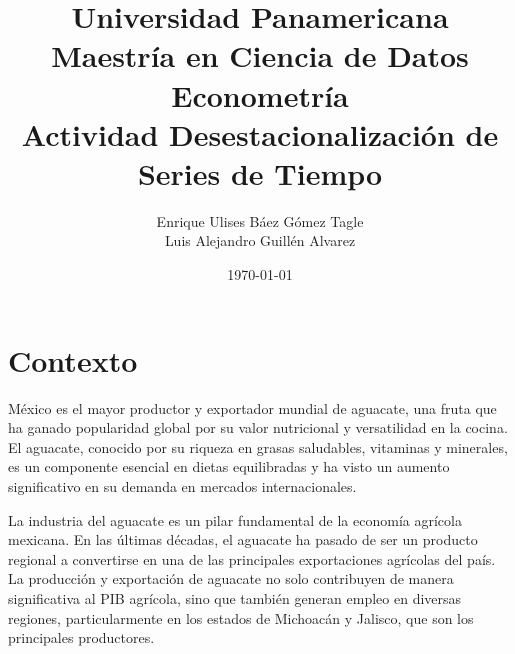 \documentclass[10pt]{article}
\title{Universidad Panamericana \\ Maestría en Ciencia de Datos 
\\ Econometría \\ \vspace{0.5cm} Actividad Desestacionalización de Series de Tiempo}
\author{Enrique Ulises Báez Gómez Tagle\\Luis Alejandro Guillén Alvarez}
\date{\today}
\begin{document}
\maketitle

\tableofcontents

\newpage
\section{Contexto}
  México es el mayor productor y exportador mundial de aguacate, una fruta que ha ganado popularidad global 
  por su valor nutricional y versatilidad en la cocina. El aguacate, conocido por su riqueza en grasas 
  saludables, vitaminas y minerales, es un componente esencial en dietas equilibradas y ha visto un aumento 
  significativo en su demanda en mercados internacionales.

  La industria del aguacate es un pilar fundamental de la economía agrícola mexicana. En las últimas 
  décadas, el aguacate ha pasado de ser un producto regional a convertirse en una de las principales 
  exportaciones agrícolas del país. La producción y exportación de aguacate no solo contribuyen de manera 
  significativa al PIB agrícola, sino que también generan empleo en diversas regiones, particularmente en 
  los estados de Michoacán y Jalisco, que son los principales productores.
\end{document}
